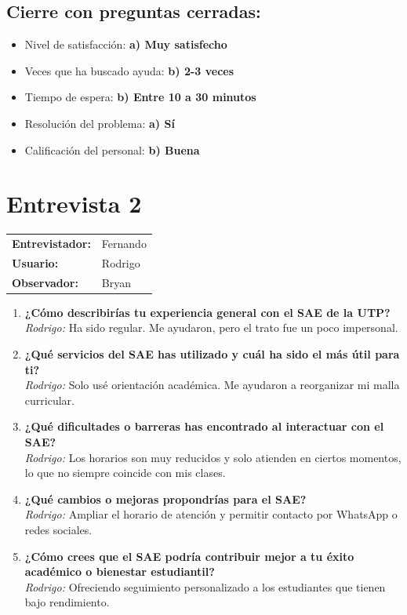 \documentclass{article}
\begin{document}
\subsection*{Cierre con preguntas cerradas:}
\begin{itemize}
    \item Nivel de satisfacción: \textbf{a) Muy satisfecho}
    \item Veces que ha buscado ayuda: \textbf{b) 2-3 veces}
    \item Tiempo de espera: \textbf{b) Entre 10 a 30 minutos}
    \item Resolución del problema: \textbf{a) Sí}
    \item Calificación del personal: \textbf{b) Buena}
\end{itemize}
\newpage
\section*{Entrevista 2}
\begin{tabular}{ll}
\textbf{Entrevistador:} & Fernando \\
\textbf{Usuario:} & Rodrigo \\
\textbf{Observador:} & Bryan \\
\end{tabular}

\begin{enumerate}[leftmargin=*, label=\textbf{\arabic*.}]
    \item \textbf{¿Cómo describirías tu experiencia general con el SAE de la UTP?} \\
    \textcolor{responsegray}{\textit{Rodrigo:} Ha sido regular. Me ayudaron, pero el trato fue un poco impersonal.}
    
    \item \textbf{¿Qué servicios del SAE has utilizado y cuál ha sido el más útil para ti?} \\
    \textcolor{responsegray}{\textit{Rodrigo:} Solo usé orientación académica. Me ayudaron a reorganizar mi malla curricular.}
    
    \item \textbf{¿Qué dificultades o barreras has encontrado al interactuar con el SAE?} \\
    \textcolor{responsegray}{\textit{Rodrigo:} Los horarios son muy reducidos y solo atienden en ciertos momentos, lo que no siempre coincide con mis clases.}
    
    \item \textbf{¿Qué cambios o mejoras propondrías para el SAE?} \\
    \textcolor{responsegray}{\textit{Rodrigo:} Ampliar el horario de atención y permitir contacto por WhatsApp o redes sociales.}
    
    \item \textbf{¿Cómo crees que el SAE podría contribuir mejor a tu éxito académico o bienestar estudiantil?} \\
    \textcolor{responsegray}{\textit{Rodrigo:} Ofreciendo seguimiento personalizado a los estudiantes que tienen bajo rendimiento.}
\end{enumerate}
\end{document}
